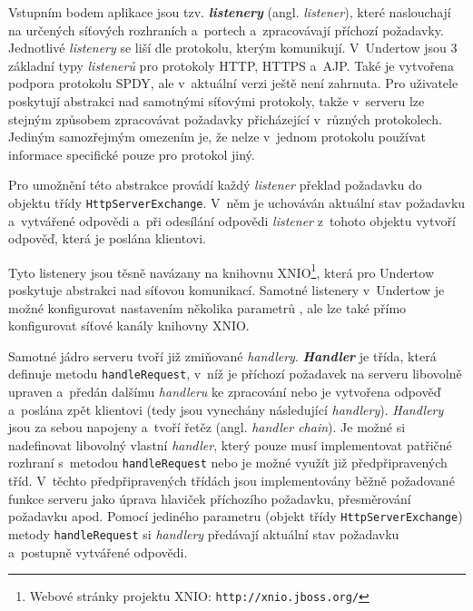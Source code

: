                 Vstupním bodem aplikace jsou tzv. \textbf{\emph{listenery}} (angl. \emph{listener}), které naslouchají na určených síťových
                rozhraních a~portech a~zpracovávají příchozí požadavky. Jednotlivé \emph{listenery} se liší dle protokolu, kterým komunikují.
                V~Undertow jsou 3 základní typy \emph{listenerů}
                pro protokoly HTTP, HTTPS a~AJP. Také je vytvořena podpora protokolu SPDY, ale v~aktuální verzi ještě není zahrnuta. 
                Pro uživatele poskytují abstrakci nad samotnými síťovými protokoly, takže v~serveru lze stejným způsobem zpracovávat
                požadavky přicházející v~různých protokolech. Jediným samozřejmým omezením je, že nelze v~jednom protokolu
                používat informace specifické pouze pro protokol jiný. 
                
                Pro umožnění této abstrakce provádí každý \emph{listener} překlad 
                požadavku do objektu třídy
                \texttt{HttpServerExchange}. V~něm je uchováván aktuální stav požadavku a~vytvářené odpovědi
                a~při odesílání odpovědi \emph{listener} z~tohoto objektu vytvoří odpověď, která je poslána klientovi.

                Tyto listenery jsou těsně navázany na knihovnu XNIO\footnote{Webové stránky projektu XNIO: \texttt{http://xnio.jboss.org/}}, která
                pro Undertow poskytuje abstrakci nad síťovou komunikací. Samotné listenery v~Undertow je možné konfigurovat
                nastavením několika parametrů \cite{undertowListeners}, ale lze také přímo konfigurovat síťové kanály knihovny XNIO.

                \medskip
                Samotné jádro serveru tvoří již zmiňované \emph{handlery}.
                \textbf{\emph{Handler}} je třída, která definuje metodu \texttt{handleRequest}, v~níž
                je příchozí požadavek na serveru libovolně upraven a~předán dalšímu \emph{handleru} ke zpracování nebo je vytvořena odpověď 
                a~poslána zpět klientovi (tedy jsou vynechány následující \emph{handlery}). 
                \emph{Handlery} jsou za sebou napojeny a~tvoří řetěz (angl. \emph{handler chain}).
                Je možné si nadefinovat libovolný vlastní \emph{handler}, který pouze musí implementovat patřičné rozhraní s~metodou 
                \texttt{handleRequest} nebo je možné využít již předpřipravených tříd. V~těchto předpřipravených třídách
                jsou implementovány běžně požadované funkce serveru jako úprava hlaviček příchozího požadavku, přesměrování požadavku apod.
                Pomocí jediného parametru (objekt třídy \texttt{HttpServerExchange}) metody \texttt{handleRequest} 
                si \emph{handlery} předávají aktuální stav požadavku a~postupně vytvářené odpovědi.


